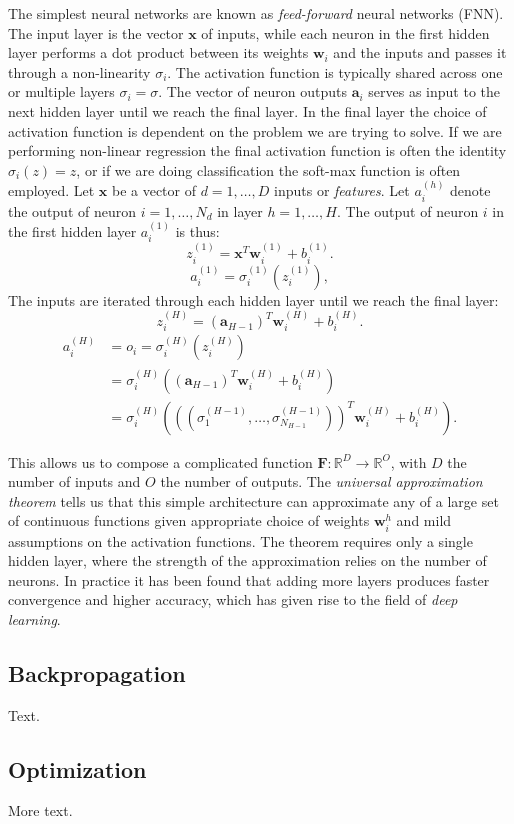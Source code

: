 The simplest neural networks are known as \textit{feed-forward} neural networks (FNN).
The input layer is the vector $\bm{x}$ of inputs, while each neuron in the first
hidden layer performs a dot product between its weights $\bm{w}_i$ and the inputs
and passes it through a non-linearity $\sigma_i$. The activation function
is typically shared across one or multiple layers $\sigma_i = \sigma$. The vector of neuron outputs
$\bm{a}_i$ serves as input to the next hidden layer until we reach the final layer.
In the final layer the choice of activation function is dependent on the problem
we are trying to solve. If we are performing non-linear regression the
final activation function is often the identity $\sigma_i(z) = z$, or if
we are doing classification the soft-max function is often employed.
\newpage
Let $\bm{x}$ be a vector of $d = 1,\dots,D$ inputs or \textit{features}. Let $a_i^{(h)}$
denote the output of neuron $i = 1,\dots,N_d$ in layer $h = 1,\dots,H$.
The output of neuron $i$ in the first hidden layer $a_i^{(1)}$ is thus:
$$ z_i^{(1)} = \bm{x}^T \bm{w}_i^{(1)} + b_i^{(1)} .$$
$$ a_i^{(1)} = \sigma_i^{(1)}(z_i^{(1)}), $$
The inputs are iterated through each hidden layer until we reach the final layer:
$$ z_i^{(H)} = (\bm{a}_{H-1})^T \bm{w}_i^{(H)} + b_i^{(H)} .$$
\begin{equation}
\begin{split}
    a_i^{(H)} &= o_i = \sigma_i^{(H)}(z_i^{(H)}) \\
    &= \sigma_i^{(H)} \left((\bm{a}_{H-1})^T \bm{w}_i^{(H)} + b_i^{(H)} \right) \\
    &= \sigma_i^{(H)} \left(
    \left( (\sigma_1^{(H-1)},\dots,\sigma_{N_{H-1}}^{(H-1)}) \right)^T
    \bm{w}_i^{(H)} + b_i^{(H)} \right) .
\end{split}
\end{equation}

This allows us to compose a complicated function $\bm{F}: \mathbb{R}^D \rightarrow
\mathbb{R}^O$, with $D$ the number of inputs and $O$ the number of outputs.
The \textit{universal approximation theorem} tells us that this simple architecture
can approximate any of a large set of continuous functions
given appropriate choice of weights $\bm{w}_i^h$ and mild assumptions
on the activation functions. The theorem requires only a single hidden layer,
where the strength of the approximation relies on the number of neurons.
In practice it has been found that adding more layers produces
faster convergence and higher accuracy, which has given rise
to the field of \textit{deep learning}.

\subsection{Backpropagation}
Text.

\subsection{Optimization}
More text.
